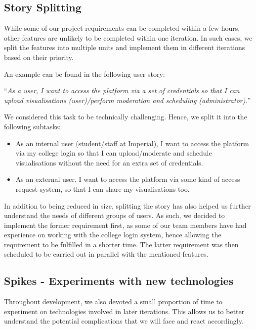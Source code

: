 \documentclass[a4paper]{article}
\begin{document}
\subsection{Story Splitting}

While some of our project requirements can be completed within a few hours, other features are unlikely to be completed within one iteration. In such cases, we split the features into multiple units and implement them in different iterations based on their priority.

An example can be found in the following user story:
\begin{center}
``\textit{As a user, I want to access the platform via a set of credentials so that I can upload visualisations (user)/perform moderation and scheduling (administrator).}'' \\
\end{center}

We considered this task to be technically challenging. Hence, we split it into the following subtasks:

\begin{itemize}

  \item As an internal user (student/staff at Imperial), I want to access the platform via my college login so that I can upload/moderate and schedule visualisations without the need for an extra set of credentials.

  \item As an external user, I want to access the platform via some kind of access request system, so that I can share my visualisations too.

\end{itemize}

In addition to being reduced in size, splitting the story has also helped us further understand the needs of different groups of users. As such, we decided to implement the former requirement first, as some of our team members have had experience on working with the college login system, hence allowing the requirement to be fulfilled in a shorter time. The latter requirement was then scheduled to be carried out in parallel with the mentioned features.

\subsection{Spikes - Experiments with new technologies}

Throughout development, we also devoted a small proportion of time to experiment on technologies involved in later iterations. This allows us to better understand the potential complications that we will face and react accordingly.
\end{document}

